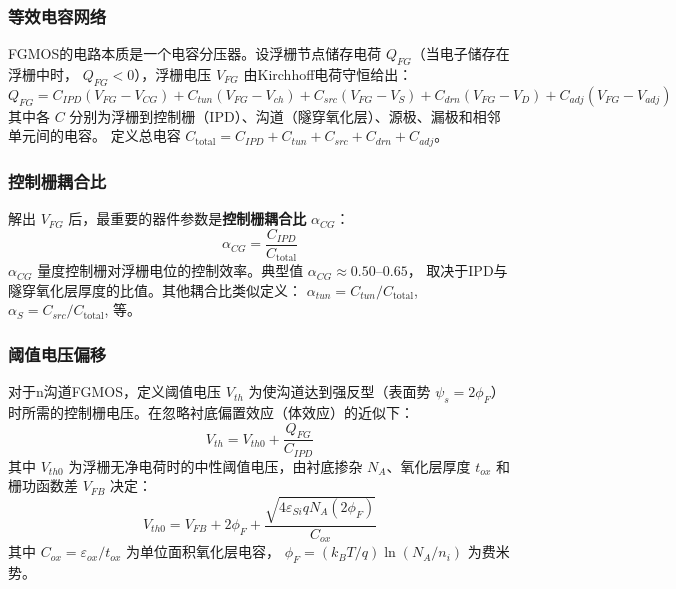 \documentclass[11pt,a4paper,twoside]{article}
\theoremstyle{definition}
\theoremstyle{plain}
\theoremstyle{remark}
\begin{document}
\subsubsection{等效电容网络}

FGMOS的电路本质是一个电容分压器。设浮栅节点储存电荷 $Q_{FG}$（当电子储存在浮栅中时，
$Q_{FG} < 0$），浮栅电压 $V_{FG}$ 由Kirchhoff电荷守恒给出：
\begin{equation}\label{eq:charge-conservation}
  Q_{FG} = C_{IPD} (V_{FG} - V_{CG})
         + C_{tun} (V_{FG} - V_{ch})
         + C_{src} (V_{FG} - V_S)
         + C_{drn} (V_{FG} - V_D)
         + C_{adj} (V_{FG} - V_{adj})
\end{equation}
其中各 $C$ 分别为浮栅到控制栅（IPD）、沟道（隧穿氧化层）、源极、漏极和相邻单元间的电容。
定义总电容 $C_{\text{total}} = C_{IPD} + C_{tun} + C_{src} + C_{drn} + C_{adj}$。

\subsubsection{控制栅耦合比}

解出 $V_{FG}$ 后，最重要的器件参数是\textbf{控制栅耦合比} $\alpha_{CG}$：
\begin{equation}\label{eq:alpha-cg}
  \boxed{ \alpha_{CG} = \frac{C_{IPD}}{C_{\text{total}}} }
\end{equation}
$\alpha_{CG}$ 量度控制栅对浮栅电位的控制效率。典型值 $\alpha_{CG} \approx 0.50$--$0.65$，
取决于IPD与隧穿氧化层厚度的比值。其他耦合比类似定义：
$\alpha_{tun} = C_{tun}/C_{\text{total}}$,
$\alpha_S = C_{src}/C_{\text{total}}$, 等。

\subsubsection{阈值电压偏移}

对于n沟道FGMOS，定义阈值电压 $V_{th}$ 为使沟道达到强反型（表面势
$\psi_s = 2\phi_F$）时所需的控制栅电压。在忽略衬底偏置效应（体效应）的近似下：
\begin{equation}\label{eq:vth-fg}
  \boxed{ V_{th} = V_{th0} + \frac{Q_{FG}}{C_{IPD}} }
\end{equation}
其中 $V_{th0}$ 为浮栅无净电荷时的中性阈值电压，由衬底掺杂 $N_A$、氧化层厚度
$t_{ox}$ 和栅功函数差 $V_{FB}$ 决定：
\begin{equation}
  V_{th0} = V_{FB} + 2\phi_F + \frac{\sqrt{4\varepsilon_{Si} q N_A (2\phi_F)}}{C_{ox}}
\end{equation}
其中 $C_{ox} = \varepsilon_{ox} / t_{ox}$ 为单位面积氧化层电容，
$\phi_F = (k_B T/q) \ln(N_A / n_i)$ 为费米势。
\end{document}
